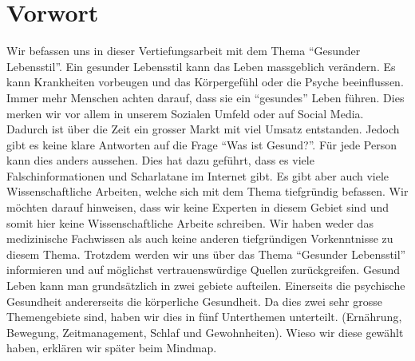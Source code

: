 \chapter{Vorwort}
\chapterauthor{\dario}
Wir befassen uns in dieser Vertiefungsarbeit mit dem Thema “Gesunder Lebensstil”.
\newline
Ein gesunder Lebensstil kann das Leben massgeblich verändern. Es kann Krankheiten vorbeugen und das Körpergefühl oder die Psyche beeinflussen.
\newline
Immer mehr Menschen achten darauf, dass sie ein “gesundes” Leben führen. Dies merken wir vor allem in unserem Sozialen Umfeld oder auf Social Media.
\newline
Dadurch ist über die Zeit ein grosser Markt mit viel Umsatz entstanden.
\newline
Jedoch gibt es keine klare Antworten auf die Frage “Was ist Gesund?”. Für jede Person kann dies anders aussehen. 
\newline
Dies hat dazu geführt, dass es viele Falschinformationen und Scharlatane im Internet gibt.
\newline
Es gibt aber auch viele Wissenschaftliche Arbeiten, welche sich mit dem Thema tiefgründig befassen.
\newline
Wir möchten darauf hinweisen, dass wir keine Experten in diesem Gebiet sind und somit hier keine Wissenschaftliche Arbeite schreiben. Wir haben weder das medizinische Fachwissen als auch keine anderen tiefgründigen Vorkenntnisse zu diesem Thema.
\newline
Trotzdem werden wir uns über das Thema “Gesunder Lebensstil” informieren und auf möglichst vertrauenswürdige Quellen zurückgreifen.
\newline
Gesund Leben kann man grundsätzlich in zwei gebiete aufteilen. Einerseits die psychische Gesundheit andererseits die körperliche Gesundheit. Da dies zwei sehr grosse Themengebiete sind, haben wir dies in fünf Unterthemen unterteilt.
\newline
(Ernährung, Bewegung, Zeitmanagement, Schlaf und Gewohnheiten). Wieso wir diese gewählt haben, erklären wir später beim Mindmap.

